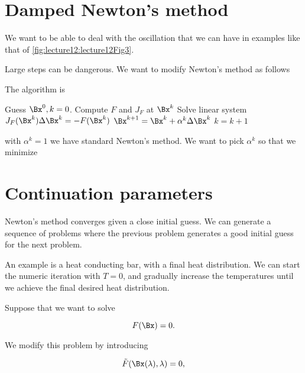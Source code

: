 \section{Damped Newton's method}

We want to be able to deal with the oscillation that we can have in examples like that of \cref{fig:lecture12:lecture12Fig3}.



Large steps can be dangerous.  We want to modify Newton's method as follows

The algorithm is
\begin{algorithmic}
\STATE Guess \( \Bx^0, k = 0 \).
\REPEAT
\STATE Compute \( F \) and \( J_F \) at \( \Bx^k \)
\STATE Solve linear system  \( J_F(\Bx^k) \Delta \Bx^k = - F(\Bx^k) \)
\STATE \( \Bx^{k+1} = \Bx^k + \alpha^k \Delta \Bx^k \)
\STATE \( k = k + 1 \)
\end{algorithmic}

with \( \alpha^k = 1 \) we have standard Newton's method.  We want to pick \( \alpha^k \) so that we minimize

\section{Continuation parameters}

Newton's method converges given a close initial guess.  We can generate a sequence of problems where the previous problem generates a good initial guess for the next problem.

An example is a heat conducting bar, with a final heat distribution.  We can start the numeric iteration with \( T = 0 \), and gradually increase the temperatures until we achieve the final desired heat distribution.

Suppose that we want to solve 

\begin{equation}\label{eqn:multiphysicsL12:340}
F(\Bx) = 0.
\end{equation}

We modify this problem by introducing

\begin{equation}\label{eqn:multiphysicsL12:360}
\tilde{F}(\Bx(\lambda), \lambda) = 0,
\end{equation}

